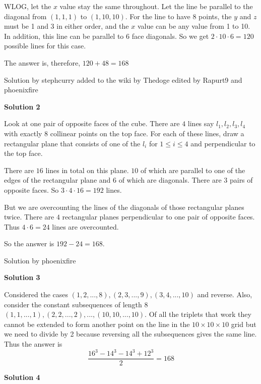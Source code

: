 \begin{enumerate}
 WLOG, let the $x$ value stay the same throughout. Let the line be parallel to the diagonal from $(1,1,1)$ to $(1,10,10)$. For the line to have 8 points, the $y$ and $z$ must be 1 and 3 in either order, and the $x$ value can be any value from 1 to 10. In addition, this line can be parallel to 6 face diagonals. So we get $2 \cdot 10 \cdot 6 = 120$ possible lines for this case. 

 The answer is, therefore, $120 + 48 = \boxed{168}$

 Solution by stephcurry added to the wiki by Thedoge edited by Rapurt9 and phoenixfire

 



\textbf{Solution 2}

Look at one pair of opposite faces of the cube. There are $4$ lines say $l_1, l_2, l_3, l_4$ with exactly $8$ collinear points on the top face. For each of these lines, draw a rectangular plane that consists of one of the $l_i$ for $1 \leq i \leq 4$ and perpendicular to the top face. 

 There are $16$ lines in total on this plane. $10$ of which are parallel to one of the edges of the rectangular plane and $6$ of which are diagonals. There are $3$ pairs of opposite faces. So $3 \cdot 4 \cdot 16=192$ lines.

 But we are overcounting the lines of the diagonals of those rectangular planes twice. There are $4$ rectangular planes perpendicular to one pair of opposite faces. Thus $4 \cdot 6=24$ lines are overcounted.

 So the answer is $192-24=\boxed{168}$.

 Solution by phoenixfire

 



\textbf{Solution 3}

Considered the cases $(1, 2, ..., 8), (2, 3, ...,9), (3, 4, ..., 10)$ and reverse. Also, consider the constant subsequences of length 8 $(1, 1, ..., 1), (2, 2, ..., 2), ..., (10, 10, ..., 10)$. Of all the triplets that work they cannot be extended to form another point on the line in the $10 \times 10 \times 10$ grid but  we need to divide by 2 because reversing all the subsequences gives the same line. Thus the answer is 
 \[\frac{16^3 - 14^3 - 14^3 + 12^3}{2} = \boxed{168}\]




\textbf{Solution 4}


\end{enumerate}
